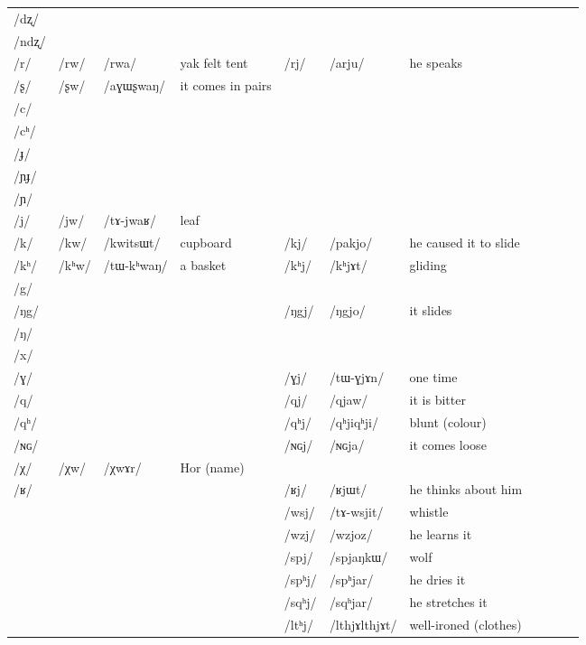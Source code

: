 \documentclass[oldfontcommands,oneside,a4paper,11pt]{article}
\newcommand{\ipa}[1]{/#1/} %
\newcommand{\deux}[1]{/#1/}
\newcommand{\trois}[1]{/#1/}
\newcommand{\tib}[1]{\cellcolor{lightgray}\textbf{#1}}
\newcommand{\idph}[1]{\cellcolor{gray}\textbf{#1}}
\begin{document}
\begin{table}
{\begin{tabular}{l|lll|lll|lll|l}
\ipa{dʐ} 	& 	& 	&	& 	& 	&\\	
\ipa{ndʐ} 	& 	& 	&	& 	& 	&\\	
\ipa{r} 	&\deux{rw}\tib{} 	&\ipa{rwa} 	&yak felt tent	&\deux{rj} 	&\ipa{arju} 	&he speaks\\	
\ipa{ʂ} 	&\deux{ʂw} \tib{}	&\ipa{aɣɯʂwaŋ} 	&it comes in pairs	& 	& 	&\\	
\ipa{c} 	& 	& 	&	& 	& 	&\\	
\ipa{cʰ} 	& 	& 	&	& 	& 	&\\	
\ipa{ɟ} 	& 	& 	&	& 	& 	&\\	
\ipa{ɲɟ} 	& 	& 	&	& 	& 	&\\	
\ipa{ɲ} 	& 	& 	&	& 	& 	&\\	
\ipa{j} 	&\deux{jw} 	&\ipa{tɤ-jwaʁ} 	&leaf	& 	& 	&\\	
\ipa{k} 	&\deux{kw}\tib{} 	&\ipa{kwitsɯt} 	&cupboard	&\deux{kj} 	&\ipa{pakjo} 	&he caused it to slide\\	
\ipa{kʰ} 	&\deux{kʰw}\tib{} 	&\ipa{tɯ-kʰwaŋ} 	&a basket	& \deux{kʰj}	& \ipa{kʰjɤt}	& gliding\\	
\ipa{g} 	& 	& 	&	& 	& 	&\\	
\ipa{ŋg} 	& 	& 	&	&\deux{ŋgj} 	&\ipa{ŋgjo} 	&it  slides\\	
\ipa{ŋ} 	& 	& 	&	& 	& 	&\\	
\ipa{x} 	& 	& 	&	& 	& 	&\\	
\ipa{ɣ} 	& 	& 	&	&\deux{ɣj} 	&\ipa{tɯ-ɣjɤn} 	&one time\\	
\ipa{q} 	& 	& 	&	&\deux{qj} 	&\ipa{qjaw} 	&it is bitter\\	
\ipa{qʰ} 	& 	& 	&	&\deux{qʰj} \idph{}	&\ipa{qʰjiqʰji} 	&blunt (colour)\\	
\ipa{ɴɢ} 	& 	& 	&	&\deux{ɴɢj} 	&\ipa{ɴɢja} 	&it comes loose\\	
\ipa{χ} 	&\deux{χw}\tib{} 	&\ipa{χwɤr} 	&Hor (name)	& 	& 	&\\	
\ipa{ʁ} 	& 	& 	&	&\deux{ʁj} 	&\ipa{ʁjɯt} 	&he thinks about 	
him\\
\midrule
 		& 		&		&		&\trois{wsj} 		&\ipa{tɤ-wsjit} 		&whistle\\
 		& 		&		&		&\trois{wzj}  \tib{}		&\ipa{wzjoz}  		&he learns it\\
\midrule												
 		& 		&		&		&\trois{spj} 		&\ipa{spjaŋkɯ} 		&wolf\\
 		& 		&		&		&\trois{spʰj} 		&\ipa{spʰjar} 		& he dries it\\
 		& 		&		&		&\trois{sqʰj} 		&\ipa{sqʰjar} 		& he stretches it\\
\midrule												
 		& 		&		&		&\trois{ltʰj}  \idph{}		&\ipa{lthjɤlthjɤt} 		&well-ironed (clothes)\\

\end{tabular}}
\end{table}
\end{document}

